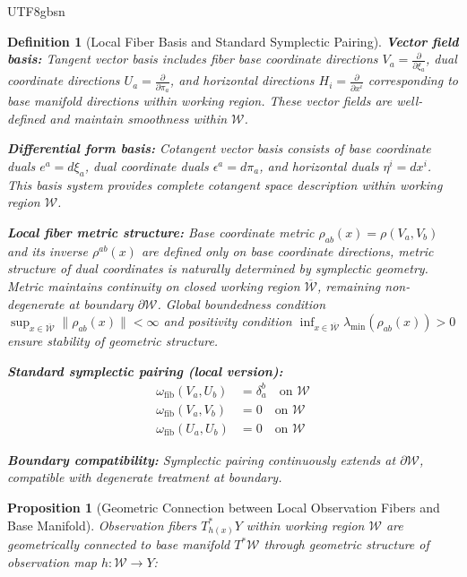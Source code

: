 \documentclass[a4paper,12pt]{extarticle}
\newtheorem{proposition}[theorem]{Proposition}
\newtheorem{definition}{Definition}
\theoremstyle{definition}
\begin{document}
\begin{CJK}{UTF8}{gbsn}
\begin{definition}[Local Fiber Basis and Standard Symplectic Pairing]
\textbf{Vector field basis:}
Tangent vector basis includes fiber base coordinate directions $V_a = \frac{\partial}{\partial \xi_a}$, dual coordinate directions $U_a = \frac{\partial}{\partial \pi_a}$, and horizontal directions $H_i = \frac{\partial}{\partial x^i}$ corresponding to base manifold directions within working region. These vector fields are well-defined and maintain smoothness within $\mathcal{W}$.

\textbf{Differential form basis:}
Cotangent vector basis consists of base coordinate duals $e^a = d\xi_a$, dual coordinate duals $\epsilon^a = d\pi_a$, and horizontal duals $\eta^i = dx^i$. This basis system provides complete cotangent space description within working region $\mathcal{W}$.

\textbf{Local fiber metric structure:}
Base coordinate metric $\rho_{ab}(x) = \rho(V_a, V_b)$ and its inverse $\rho^{ab}(x)$ are defined only on base coordinate directions, metric structure of dual coordinates is naturally determined by symplectic geometry. Metric maintains continuity on closed working region $\overline{\mathcal{W}}$, remaining non-degenerate at boundary $\partial \mathcal{W}$. Global boundedness condition $\sup_{x \in \overline{\mathcal{W}}} \|\rho_{ab}(x)\| < \infty$ and positivity condition $\inf_{x \in \overline{\mathcal{W}}} \lambda_{\min}(\rho_{ab}(x)) > 0$ ensure stability of geometric structure.

\textbf{Standard symplectic pairing (local version):}
\begin{align*}
\omega_{\text{fib}}(V_a, U_b) &= \delta_a^b \quad \text{on } \mathcal{W}\\
\omega_{\text{fib}}(V_a, V_b) &= 0 \quad \text{on } \mathcal{W}\\
\omega_{\text{fib}}(U_a, U_b) &= 0 \quad \text{on } \mathcal{W}
\end{align*}

\textbf{Boundary compatibility:} Symplectic pairing continuously extends at $\partial \mathcal{W}$, compatible with degenerate treatment at boundary.
\end{definition}

\begin{proposition}[Geometric Connection between Local Observation Fibers and Base Manifold]
Observation fibers $T^*_{h(x)}Y$ within working region $\mathcal{W}$ are geometrically connected to base manifold $T^*\mathcal{W}$ through geometric structure of observation map $h: \mathcal{W} \to Y$:


\end{proposition}
\end{CJK}
\end{document}
